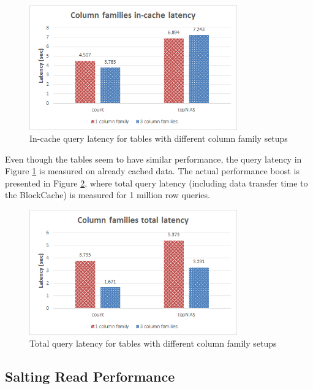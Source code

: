 \begin{figure}[H]
\centering
\includegraphics[width=0.8\textwidth]{figures/benchmarks_hbase_cf_in-cache_latency}
\caption{In-cache query latency for tables with different column family setups}
\label{figure:benchmarks_hbase_cf_in-cache_latency}
\end{figure}

Even though the tables seem to have similar performance, the query latency in Figure \ref{figure:benchmarks_hbase_cf_in-cache_latency} is measured on already cached data. The actual performance boost is presented in Figure \ref{figure:benchmarks_hbase_cf_total_latency}, where total query latency (including data transfer time to the BlockCache) is measured for 1 million row queries.

\begin{figure}[H]
\centering
\includegraphics[width=0.8\textwidth]{figures/benchmarks_hbase_cf_total_latency}
\caption{Total query latency for tables with different column family setups}
\label{figure:benchmarks_hbase_cf_total_latency}
\end{figure}

\subsection{Salting Read Performance}\label{subsection:benchmarks_hbase_salting}


